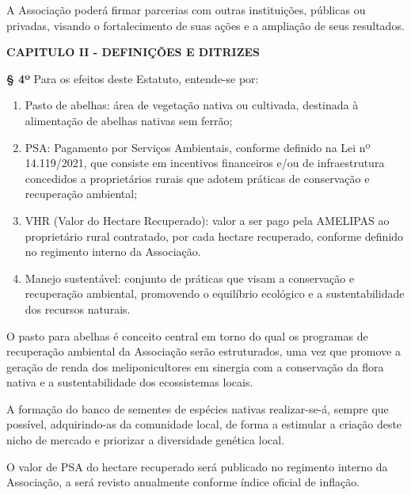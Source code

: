 \documentclass[12pt]{article}
\newcommand{\capitulo}[1]{\vspace{1.0em}\begin{center}\fontseries{b}\selectfont\textbf{\MakeUppercase{#1}}\end{center}}
\newcommand{\artigo}[1]{\vspace{1.0em}\noindent\textbf{#1}\hspace{0.75em}}
\newcommand{\paragrafo}[1]{\vspace{1.0em}\noindent{#1}\hspace{0.75em}}
\begin{document}
\paragrafo{§ 2º} A Associação poderá firmar parcerias com outras instituições, públicas ou privadas, visando o fortalecimento de suas ações e a ampliação de seus resultados.


\capitulo{Capitulo II - Definições e ditrizes}

\artigo{§ 4º} Para os efeitos deste Estatuto, entende-se por:
\begin{enumerate}[label=\Roman* -]
  \item Pasto de abelhas: área de vegetação nativa ou cultivada, destinada à alimentação de abelhas nativas sem ferrão;
  \item PSA: Pagamento por Serviços Ambientais, conforme definido na Lei nº 14.119/2021, que consiste em incentivos financeiros e/ou de infraestrutura concedidos a proprietários rurais que adotem práticas de conservação e recuperação ambiental;
  \item VHR (Valor do Hectare Recuperado): valor a ser pago pela AMELIPAS ao proprietário rural contratado, por cada hectare recuperado, conforme definido no regimento interno da Associação.
  \item Manejo sustentável: conjunto de práticas que visam a conservação e recuperação ambiental, promovendo o equilíbrio ecológico e a sustentabilidade dos recursos naturais.
\end{enumerate}

\paragrafo{§ 3º} O pasto para abelhas é conceito central em torno do qual os programas de recuperação ambiental da Associação serão estruturados, uma vez que promove a geração de renda dos meliponicultores em sinergia com a conservação da flora nativa e a sustentabilidade dos ecossistemas locais.

\paragrafo{§ 3º} A formação do banco de sementes de espécies nativas realizar-se-á, sempre que possível, adquirindo-as da comunidade local, de forma a estimular a criação deste nicho de mercado e priorizar a diversidade genética local.

\paragrafo{§ 4º} O valor de PSA do hectare recuperado será publicado no regimento interno da Associação, a será revisto anualmente conforme índice oficial de inflação.


\end{document}

